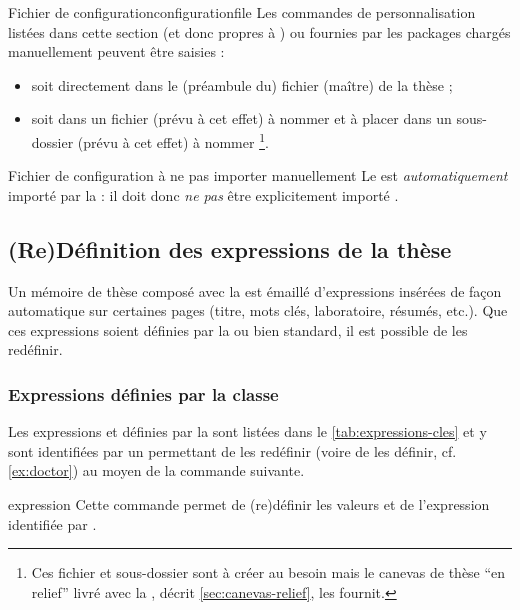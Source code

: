 \begin{dbremark}{Fichier de configuration}{configurationfile}
  Les commandes de personnalisation listées dans cette section (et donc propres
  à \yatcl{}) ou fournies par les packages chargés manuellement peuvent être
  saisies :
  \begin{itemize}
  \item soit directement dans le (préambule du) fichier (maître) de la thèse ;
  \item soit dans un fichier (prévu à cet effet) à nommer
    \file{\configurationfile} et à placer dans un sous-dossier (prévu à cet
    effet) à nommer \directory{\configurationdirectory}\footnote{Ces fichier et
      sous-dossier sont à créer au besoin mais le canevas de thèse \enquote{en
        relief} livré avec la \yatcl, décrit \vref{sec:canevas-relief}, les
      fournit.}.
  \end{itemize}
\end{dbremark}

\begin{dbwarning}{Fichier de configuration à ne pas importer manuellement}{}
  Le \File{\configurationfile} est \emph{automatiquement} importé par la
  \yatcl{} : il doit donc \emph{ne pas} être explicitement importé .
\end{dbwarning}

\subsection{(Re)Définition des expressions de la
  thèse}\label{sec:expressions-cles}

Un mémoire de thèse composé avec la \yatcl est émaillé d'expressions insérées
de façon automatique sur certaines pages (titre, mots clés, laboratoire,
résumés, etc.). Que ces expressions soient définies par la \yatcl ou bien
standard, il est possible de les redéfinir.

\subsubsection{Expressions définies par la classe}
\label{sec:expr-defin-par}

Les expressions  et  définies par la \yatcl
sont listées dans le \vref{tab:expressions-cles} et y sont identifiées par un
 permettant de les redéfinir (voire de les définir, cf.
\vref{ex:doctor}) au moyen de la commande  suivante.
%
\begin{docCommand}{expression}{}
  Cette commande permet de (re)définir les valeurs  et
   de l'expression identifiée par .
\end{docCommand}

